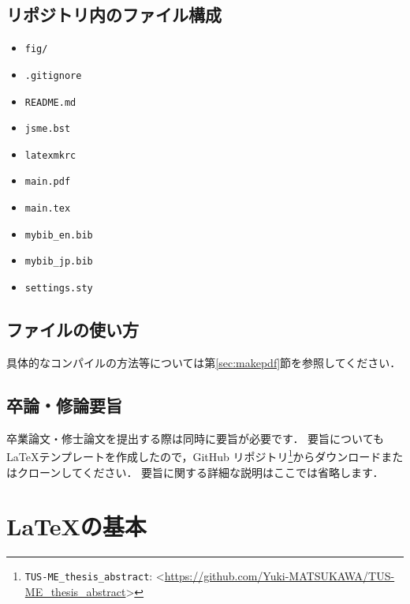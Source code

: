 \documentclass[
    paper=a4paper,      %
    report,             %
    fleqn,              %
    fontsize=12pt,      %
    jafontsize=12pt,    %
    head_space=33mm,    %
    foot_space=30mm,    %
    gutter=25mm,        %
    fore-edge=10mm      %
    ]{jlreq}            %
\begin{document}
\section{リポジトリ内のファイル構成}
\label{sec:composition}

\begin{tcolorbox}[enhanced, title={\texttt{Yuki-MATSUKAWA/TUS-ME\_thesis\_template}}, drop fuzzy shadow]
    \begin{itemize}
        \item \verb|fig/|
        \item \verb|.gitignore|
        \item \verb|README.md|
        \item \verb|jsme.bst|
        \item \verb|latexmkrc|
        \item \verb|main.pdf|
        \item \verb|main.tex|
        \item \verb|mybib_en.bib|
        \item \verb|mybib_jp.bib|
        \item \verb|settings.sty|
    \end{itemize}
\end{tcolorbox}



\section{ファイルの使い方}
\label{sec:howtouse}

具体的なコンパイルの方法等については第\ref{sec:makepdf}節を参照してください．


\section{卒論・修論要旨}
\label{sec:abstract}

卒業論文・修士論文を提出する際は同時に要旨が必要です．
要旨についても \LaTeX テンプレートを作成したので，GitHub リポジトリ\footnote{\texttt{TUS-ME\_thesis\_abstract}: \textless\url{https://github.com/Yuki-MATSUKAWA/TUS-ME_thesis_abstract}\textgreater}からダウンロードまたはクローンしてください．
要旨に関する詳細な説明はここでは省略します．


\chapter{\LaTeX の基本}
\label{ch:basic}
\end{document}
